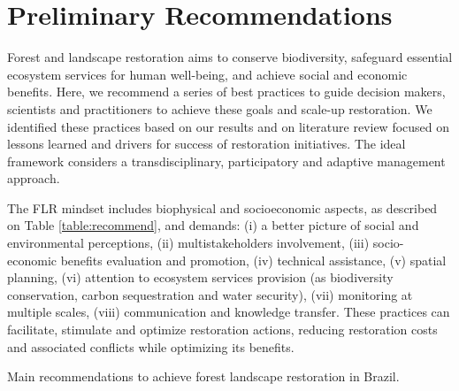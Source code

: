 



\chapter{Preliminary Recommendations} \label{ch:recom}


Forest and landscape restoration aims to conserve biodiversity, safeguard essential ecosystem services for human well-being, and achieve social and economic benefits. Here, we recommend a series of best practices to guide decision makers, scientists and practitioners to achieve these goals and scale-up restoration. We identified these practices based on our results and on literature review focused on lessons learned and drivers for success of restoration initiatives. The ideal framework considers a transdisciplinary, participatory and adaptive management approach. 

The FLR mindset includes biophysical and socioeconomic aspects, as described on Table \ref{table:recommend}, and demands: (i) a better picture of social and environmental perceptions, (ii) multistakeholders involvement, (iii) socio-economic benefits evaluation and promotion, (iv) technical assistance, (v) spatial planning, (vi) attention to ecosystem services provision (as biodiversity conservation, carbon sequestration and water security), (vii) monitoring at multiple scales, (viii) communication and knowledge transfer. These practices can facilitate, stimulate and optimize restoration actions, reducing restoration costs and associated conflicts while optimizing its benefits.

\newpage


{\small 
\begin{table} 
\caption{Main recommendations to achieve forest landscape restoration in Brazil.}

\label{table:recommend}
\end{table}
}
\newpage


